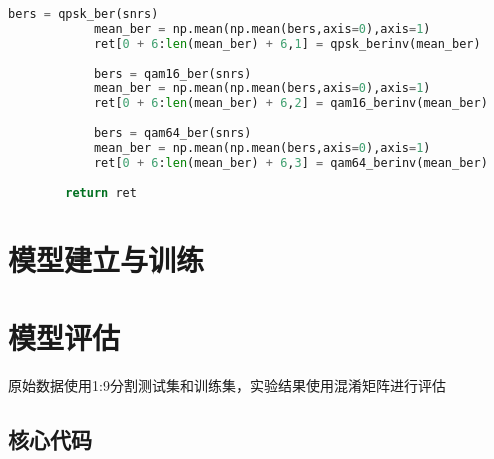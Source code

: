 \documentclass[UTF8]{article}
\begin{document}
\begin{lstlisting}[language=Python, caption=$ get\_SNRs.py $]
            bers = qpsk_ber(snrs)
            mean_ber = np.mean(np.mean(bers,axis=0),axis=1)
            ret[0 + 6:len(mean_ber) + 6,1] = qpsk_berinv(mean_ber)
    
            bers = qam16_ber(snrs)
            mean_ber = np.mean(np.mean(bers,axis=0),axis=1)
            ret[0 + 6:len(mean_ber) + 6,2] = qam16_berinv(mean_ber)
    
            bers = qam64_ber(snrs)
            mean_ber = np.mean(np.mean(bers,axis=0),axis=1)
            ret[0 + 6:len(mean_ber) + 6,3] = qam64_berinv(mean_ber)
    
        return ret
\end{lstlisting}

\section{模型建立与训练}

\section{模型评估}
原始数据使用1:9分割测试集和训练集，实验结果使用混淆矩阵进行评估
\subsection{核心代码}
\begin{lstlisting}[language=Python, caption=$ get\_SNRs.py $]
\end{lstlisting}
\end{document}

